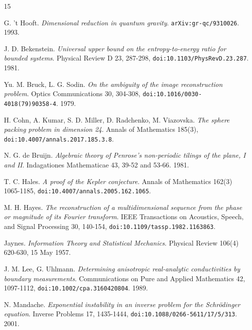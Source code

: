 \begin{thebibliography}{15}

G. 't Hooft. \emph{Dimensional reduction in quantum gravity}. \texttt{arXiv:gr-qc/\allowbreak{}9310026}. 1993.

J. D. Bekenstein. \emph{Universal upper bound on the entropy-to-energy ratio for bounded systems}. Physical Review D 23, 287-298, \texttt{doi:10.1103/\allowbreak{}PhysRevD.23.287}. 1981.

Yu. M. Bruck, L. G. Sodin. \emph{On the ambiguity of the image reconstruction problem}. Optics Communications 30, 304-308, \texttt{doi:10.1016/\allowbreak{}0030-4018(79)90358-4}. 1979.

H. Cohn, A. Kumar, S. D. Miller, D. Radchenko, M. Viazovska. \emph{The sphere packing problem in dimension 24}. Annals of Mathematics 185(3), \texttt{doi:10.4007/\allowbreak{}annals.2017.185.3.8}.

N. G. de Bruijn. \emph{Algebraic theory of Penrose's non-periodic tilings of the plane, I and II}. Indagationes Mathematicae 43, 39-52 and 53-66. 1981.

T. C. Hales. \emph{A proof of the Kepler conjecture}. Annals of Mathematics 162(3) 1065-1185, \texttt{doi:10.4007/\allowbreak{}annals.2005.162.1065}.

M. H. Hayes. \emph{The reconstruction of a multidimensional sequence from the phase or magnitude of its Fourier transform}. IEEE Transactions on Acoustics, Speech, and Signal Processing 30, 140-154, \texttt{doi:10.1109/\allowbreak{}tassp.1982.1163863}.

Jaynes. \emph{Information Theory and Statistical Mechanics}. Physical Review 106(4) 620-630, 15 May 1957.

J. M. Lee, G. Uhlmann. \emph{Determining anisotropic real-analytic conductivities by boundary measurements}. Communications on Pure and Applied Mathematics 42, 1097-1112, \texttt{doi:10.1002/\allowbreak{}cpa.3160420804}. 1989.

N. Mandache. \emph{Exponential instability in an inverse problem for the Schrödinger equation}. Inverse Problems 17, 1435-1444, \texttt{doi:10.1088/\allowbreak{}0266-5611/\allowbreak{}17/\allowbreak{}5/\allowbreak{}313}. 2001.


\end{thebibliography}
